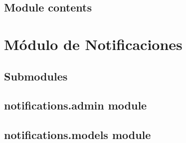 \documentclass[letterpaper,10pt,spanish]{sphinxmanual}
\begin{document}

\begin{fulllineitems}
\label{messages:messages.views.messages_list_no_read}
\end{fulllineitems}


\begin{fulllineitems}
\label{messages:messages.views.messages_list_read}
\end{fulllineitems}


\begin{fulllineitems}
\label{messages:messages.views.new_message}
\end{fulllineitems}



\subsection{Module contents}
\label{messages:module-messages}\label{messages:module-contents}

\section{Módulo de Notificaciones}
\label{notifications::doc}\label{notifications:notifications-package}

\subsection{Submodules}
\label{notifications:submodules}

\subsection{notifications.admin module}
\label{notifications:notifications-admin-module}\label{notifications:module-notifications.admin}

\subsection{notifications.models module}
\label{notifications:module-notifications.models}\label{notifications:notifications-models-module}
\end{document}

